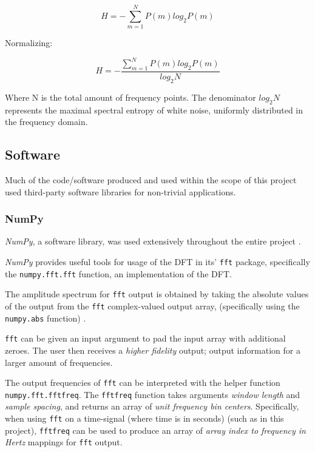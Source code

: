 \documentclass{article}
\begin{document}
\begin{equation}
H = -\sum_{m=1}^N P(m) log_2 P(m)
\end{equation}

Normalizing:

\begin{equation}
H = -\frac{\sum_{m=1}^N P(m) log_2 P(m)}{log_2 N}
\end{equation}

Where N is the total amount of frequency points.
The denominator \begin{math}log_2 N\end{math} represents the maximal spectral entropy of white noise, uniformly distributed in the frequency domain.

\subsection{Software}

Much of the code/software produced and used within the scope of this project used third-party software libraries for non-trivial applications.

\subsubsection{NumPy}\label{NumPy BG}

\textit{NumPy}, a software library, was used extensively throughout the entire project \citep{numpy}.

\textit{NumPy} provides useful tools for usage of the DFT in its' \texttt{fft} package, specifically the \texttt{numpy.fft.fft} function, an implementation of the DFT. 

The amplitude spectrum for \texttt{fft} output is obtained by taking the absolute values of the output from the \texttt{fft} complex-valued output array, (specifically using the \texttt{numpy.abs} function) \citep{numpy}.

\texttt{fft} can be given an input argument to pad the input array with additional zeroes. 
The user then receives a \textit{higher fidelity} output; output information for a larger amount of frequencies.

The output frequencies of \texttt{fft} can be interpreted with the helper function \texttt{numpy.fft.fftfreq}. 
The \texttt{fftfreq} function takes arguments \textit{window length} and \textit{sample spacing}, and returns an array of \textit{unit frequency bin centers}. 
Specifically, when using \texttt{fft} on a time-signal (where time is in seconds) (such as in this project), \texttt{fftfreq} can be used to produce an array of \textit{array index to frequency in Hertz} mappings for \texttt{fft} output.
\end{document}
